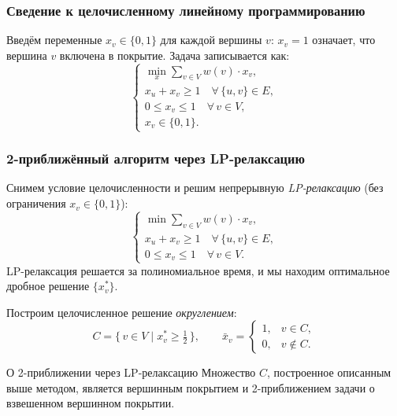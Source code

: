 \subsubsection*{Сведение к целочисленному линейному программированию}

Введём переменные $x_v \in \{0,1\}$ для каждой вершины $v$: $x_v = 1$ означает, что вершина $v$ включена в покрытие. Задача записывается как:
\[
\begin{cases}
	\displaystyle\min_{x} \sum_{v \in V} w(v)\cdot x_v, \\[4pt]
	x_u + x_v \geq 1 \quad \forall\, \{u,v\} \in E, \\[2pt]
	0 \leq x_v \leq 1 \quad \forall\, v \in V, \\[2pt]
	x_v \in \{0,1\}.
\end{cases}
\]

\subsubsection*{2-приближённый алгоритм через LP-релаксацию}

Снимем условие целочисленности и решим непрерывную \emph{LP-релаксацию} (без ограничения $x_v \in \{0,1\}$):
\[
\begin{cases}
	\displaystyle\min \sum_{v \in V} w(v)\cdot x_v, \\[4pt]
	x_u + x_v \geq 1 \quad \forall\, \{u,v\} \in E, \\[2pt]
	0 \leq x_v \leq 1 \quad \forall\, v \in V.
\end{cases}
\]
LP-релаксация решается за полиномиальное время, и мы находим оптимальное дробное решение $\{x^*_v\}$.

Построим целочисленное решение \emph{округлением}:
\[
C = \bigl\{\, v \in V \mid x^*_v \geq \tfrac{1}{2} \,\bigr\}, \qquad
\bar{x}_v = \begin{cases} 1, & v \in C, \\ 0, & v \notin C. \end{cases}
\]

\begin{Theorem}{О 2-приближении через LP-релаксацию}{}
	Множество $C$, построенное описанным выше методом, является вершинным покрытием и 2-приближением задачи о взвешенном вершинном покрытии.
\end{Theorem}

